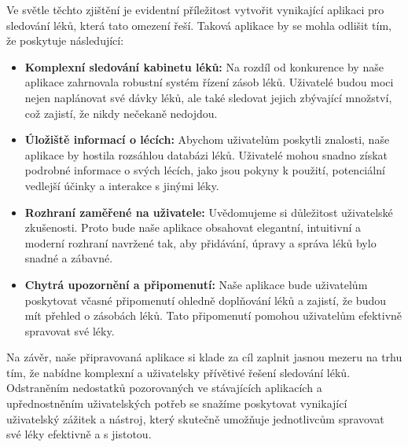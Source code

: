 \documentclass[a4paper, 11pt]{article}
\begin{document}
 Ve světle těchto zjištění je evidentní příležitost vytvořit vynikající aplikaci pro sledování léků, která tato omezení řeší. Taková aplikace by se mohla odlišit tím, že poskytuje následující:
 \begin{itemize}
     \item \textbf{Komplexní sledování kabinetu léků:} Na rozdíl od konkurence by naše aplikace zahrnovala robustní systém řízení zásob léků. Uživatelé budou moci nejen naplánovat své dávky léků, ale také sledovat jejich zbývající množství, což zajistí, že nikdy nečekaně nedojdou.
     \item \textbf{Úložiště informací o lécích:} Abychom uživatelům poskytli znalosti, naše aplikace by hostila rozsáhlou databázi léků. Uživatelé mohou snadno získat podrobné informace o svých lécích, jako jsou pokyny k použití, potenciální vedlejší účinky a interakce s jinými léky.
     \item \textbf{Rozhraní zaměřené na uživatele:} Uvědomujeme si důležitost uživatelské zkušenosti. Proto bude naše aplikace obsahovat elegantní, intuitivní a moderní rozhraní navržené tak, aby přidávání, úpravy a správa léků bylo snadné a zábavné.
     \item \textbf{Chytrá upozornění a připomenutí:} Naše aplikace bude uživatelům poskytovat včasné připomenutí ohledně doplňování léků a zajistí, že budou mít přehled o zásobách léků. Tato připomenutí pomohou uživatelům efektivně spravovat své léky.
 \end{itemize}
Na závěr, naše připravovaná aplikace si klade za cíl zaplnit jasnou mezeru na trhu tím, že nabídne komplexní a uživatelsky přívětivé řešení sledování léků. Odstraněním nedostatků pozorovaných ve stávajících aplikacích a upřednostněním uživatelských potřeb se snažíme poskytovat vynikající uživatelský zážitek a nástroj, který skutečně umožňuje jednotlivcům spravovat své léky efektivně a s jistotou.
\end{document}
